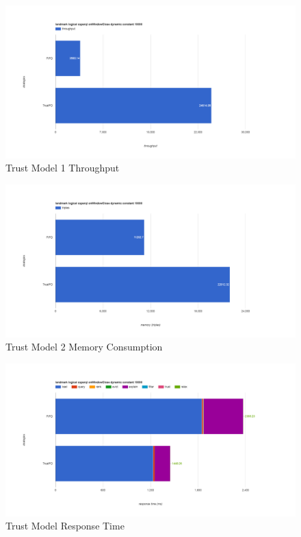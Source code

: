 \begin{figure}[!htbp]
	\centering
    \includegraphics[width=6.5in]{img/app3-trust-1-t.png}
    \caption{Trust Model 1 Throughput}
\end{figure}
\begin{figure}[!htbp]
	\centering
    \includegraphics[width=6.5in]{img/app3-trust-2-m.png}
    \caption{Trust Model 2 Memory Consumption}
\end{figure}
\begin{figure}[!htbp]
	\centering
    \includegraphics[width=6.5in]{img/app3-trust-2-r.png}
    \caption{Trust Model Response Time}
\end{figure}
